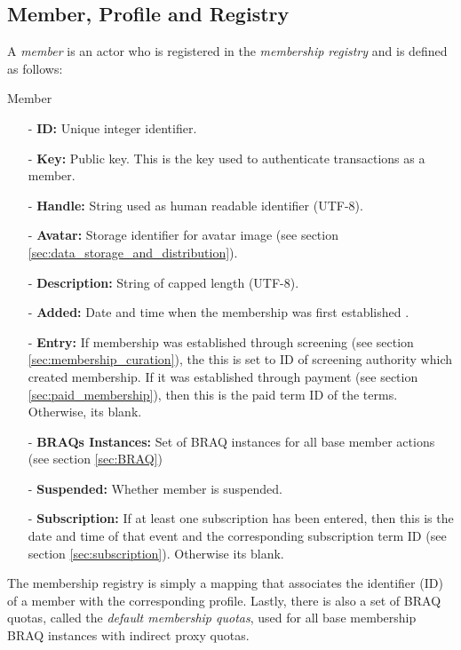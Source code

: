\documentclass{article}
\newenvironment{concept_box}[1]
    {
    \begin{tcolorbox}
    {\large \textbf{#1} }
    }
    {
    \end{tcolorbox}
    }
\begin{document}
\subsection{Member, Profile and Registry} \label{sec:member_profile}

A \textit{member} is an actor who is registered in the \textit{membership registry} and is defined as follows: \\

\begin{concept_box}{Member}
    \begin{itemize}
      \item[-] \textbf{ID:} Unique integer identifier.
      \item[-] \textbf{Key:} Public key. This is the key used to authenticate transactions as a member. %
      \item[-] \textbf{Handle:} String used as human readable identifier (UTF-8).
      \item[-] \textbf{Avatar:} Storage identifier for avatar image (see section \ref{sec:data_storage_and_distribution}).
      \item[-] \textbf{Description:} String of capped length (UTF-8).

      \item[-] \textbf{Added:} Date and time when the membership was first established .
      \item[-] \textbf{Entry:} If membership was established through screening (see section \ref{sec:membership_curation}), the this is set to ID of screening authority which created membership. If it was established through payment (see section \ref{sec:paid_membership}), then this is the paid term ID of the terms. Otherwise, its blank.
      \item[-] \textbf{BRAQs Instances:} Set of BRAQ instances for all base member actions (see section \ref{sec:BRAQ})
      \item[-] \textbf{Suspended:} Whether member is suspended.
      \item[-] \textbf{Subscription:} If at least one subscription has been entered, then this is the date and time of that event and the corresponding subscription term ID (see section \ref{sec:subscription}). Otherwise its blank.
    \end{itemize}
\end{concept_box}

The membership registry is simply a mapping that associates the identifier (ID) of a member with the corresponding profile. Lastly, there is also a set of BRAQ quotas, called the \textit{default membership quotas}, used for all base membership BRAQ instances with indirect proxy quotas.
\end{document}
